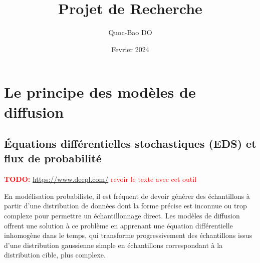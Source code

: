 \documentclass[a4paper,10pt]{article}
\title{Projet de Recherche}
\author{Quoc-Bao DO}
\date{Fevrier 2024}
\theoremstyle{definition} %
\theoremstyle{definition} %
\theoremstyle{definition} %
\theoremstyle{definition} %
\newcommand{\todo}[1]{\textcolor{red}{\textbf{TODO:} #1}}
\begin{document}
\maketitle


\tableofcontents


\section{Le principe des modèles de diffusion}
\subsection{Équations différentielles stochastiques (EDS) et flux de probabilité}

\todo{\url{https://www.deepl.com/} revoir le texte avec cet outil}

En modélisation probabiliste, il est fréquent de devoir générer des échantillons à partir d'une distribution de données dont la forme précise est inconnue ou trop complexe pour permettre un échantillonnage direct. Les modèles de diffusion offrent une solution à ce problème en apprenant une équation différentielle inhomogène dans le temps, qui transforme progressivement des échantillons issus d'une distribution gaussienne simple en échantillons correspondant à la distribution cible, plus complexe.
\end{document}

